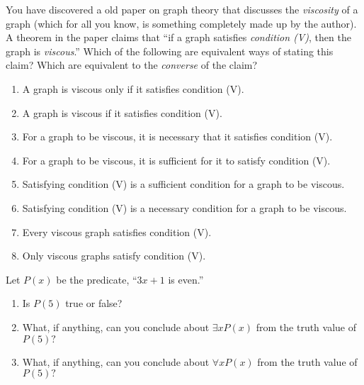 \documentclass[11pt,]{book}
\theoremstyle{ptxplainnotitle}
\theoremstyle{ptxplaintitle}
\theoremstyle{ptxdefinitionnotitle}
\theoremstyle{ptxdefinitiontitle}
\theoremstyle{ptxdefinitionnotitle}
\theoremstyle{ptxdefinitiontitle}
\theoremstyle{ptxdefinitionnotitle}
\theoremstyle{ptxdefinitiontitle}
\theoremstyle{ptxdefinitiontitlenonumber}
\theoremstyle{ptxdefinitiontitlenonumber}
\numberwithin{equation}{chapter}
\begin{document}
\begin{divisionexercise}{6}\hypertarget{exercise-154}{}
\hypertarget{p-1997}{}%
You have discovered a old paper on graph theory that discusses the \emph{viscosity} of a graph (which for all you know, is something completely made up by the author).  A theorem in the paper claims that ``if a graph satisfies \emph{condition (V)}, then the graph is \emph{viscous}.''  Which of the following are equivalent ways of stating this claim?  Which are equivalent to the \emph{converse} of the claim? \leavevmode%
\begin{enumerate}[label=\alph*.]
\item\hypertarget{li-956}{}\hypertarget{p-1998}{}%
A graph is viscous only if it satisfies condition (V). %
\item\hypertarget{li-961}{}\hypertarget{p-2003}{}%
A graph is viscous if it satisfies condition (V). %
\item\hypertarget{li-966}{}\hypertarget{p-2008}{}%
For a graph to be viscous, it is necessary that it satisfies condition (V). %
\item\hypertarget{li-971}{}\hypertarget{p-2013}{}%
For a graph to be viscous, it is sufficient for it to satisfy condition (V). %
\item\hypertarget{li-976}{}\hypertarget{p-2018}{}%
Satisfying condition (V) is a sufficient condition for a graph to be viscous. %
\item\hypertarget{li-981}{}\hypertarget{p-2023}{}%
Satisfying condition (V) is a necessary condition for a graph to be viscous. %
\item\hypertarget{li-986}{}\hypertarget{p-2028}{}%
Every viscous graph satisfies condition (V). %
\item\hypertarget{li-991}{}\hypertarget{p-2033}{}%
Only viscous graphs satisfy condition (V). %
\end{enumerate}
%
\end{divisionexercise}%
\begin{divisionexercise}{7}\hypertarget{exercise-155}{}
\hypertarget{p-2052}{}%
Let \(P(x)\) be the predicate, ``\(3x+1\) is even.'' \leavevmode%
\begin{enumerate}[label=\alph*.]
\item\hypertarget{li-1007}{}\hypertarget{p-2053}{}%
Is \(P(5)\) true or false? %
\item\hypertarget{li-1012}{}\hypertarget{p-2058}{}%
What, if anything, can you conclude about \(\exists x P(x)\) from the truth value of \(P(5)\text{?}\)%
\item\hypertarget{li-1013}{}\hypertarget{p-2059}{}%
What, if anything, can you conclude about \(\forall x P(x)\) from the truth value of \(P(5)\text{?}\)%
\end{enumerate}
%
\end{divisionexercise}%
\end{document}
